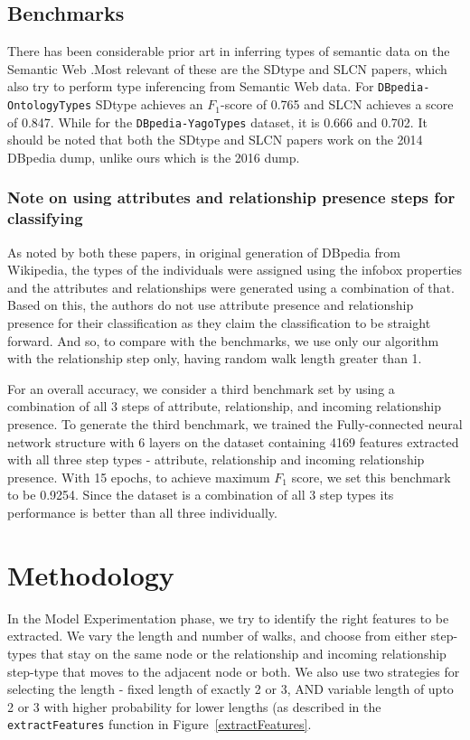 \documentclass[runningheads,a4paper]{IEEEtran}
\begin{document}
\subsection{Benchmarks}
There has been considerable prior art in inferring types of semantic data on the Semantic Web \cite{paulheim2017knowledge}\cite{miao2016automatic}.Most relevant of these are the SDtype\cite{paulheim2013type} and SLCN\cite{melo2016type}\cite{melo2017type} papers, which also try to perform type inferencing from Semantic Web data. For \texttt{DBpedia-OntologyTypes} SDtype achieves an $F_1$-score of  0.765 and SLCN\cite{melo2016type} achieves a score of 0.847. While for the \texttt{DBpedia-YagoTypes} dataset, it is 0.666 and 0.702. It should be noted that both the SDtype and SLCN papers work on the 2014 DBpedia dump, unlike ours which is the 2016 dump.

\subsubsection{Note on using attributes and relationship presence steps for classifying} 
As noted by both these papers, in original generation of DBpedia from Wikipedia, the types of the individuals were assigned using the infobox properties and the attributes and relationships were generated using a combination of that. Based on this, the authors do not use attribute presence and relationship presence for their classification as they claim the classification to be straight forward. And so, to compare with the benchmarks, we use only our algorithm with the relationship step only, having random walk length greater than 1. 

For an overall accuracy, we consider a third benchmark set by using a combination of all 3 steps of attribute, relationship, and incoming relationship presence. To generate the third benchmark, we trained the Fully-connected neural network structure with 6 layers on the dataset containing 4169 features extracted with all three step types - attribute, relationship and incoming relationship presence. With 15 epochs, to achieve maximum $F_1$ score, we set this benchmark to be 0.9254. Since the dataset is a combination of all 3 step types its performance is better than all three individually.

\section{Methodology}
\label{methodology}
In the Model Experimentation phase, we try to identify the right features to be extracted. We vary the length and number of walks, and choose from either step-types that stay on the same node or the relationship and incoming relationship step-type that moves to the adjacent node or both. We also use two strategies for selecting the length - fixed length of exactly 2 or 3, AND variable length of upto 2 or 3 with higher probability for lower lengths (as described in the \texttt{extractFeatures} function in Figure~\ref{extractFeatures}.
\end{document}
